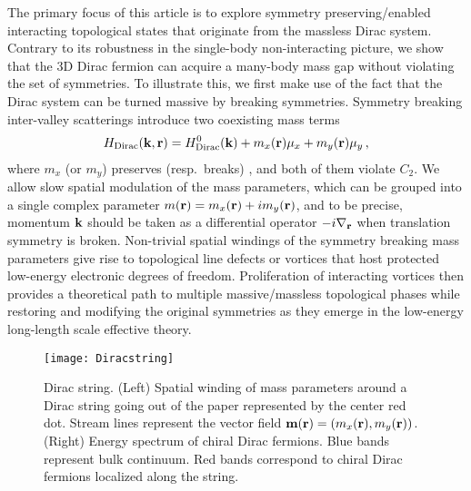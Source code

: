 The primary focus of this article is to explore symmetry preserving/enabled interacting topological states that originate from the massless Dirac system. Contrary to its robustness in the single-body non-interacting picture, we show that the 3D Dirac fermion can acquire a many-body mass gap without violating the set of symmetries. To illustrate this, we first make use of the fact that the Dirac system can be turned massive by breaking symmetries. Symmetry breaking inter-valley scatterings introduce two coexisting mass terms \begin{align}H_{\mathrm{Dirac}}({\bf k},{\bf r})=H_{\mathrm{Dirac}}^0({\bf k})+m_x({\bf r})\mu_x+m_y({\bf r})\mu_y \,, \label{DiracHam}\end{align} where $m_x$ (or $m_y$) preserves (resp.~breaks) \TR, and both of them violate $C_2$. We allow slow spatial modulation of the mass parameters, which can be grouped into a single complex parameter $m({\bf r})=m_x({\bf r})+im_y({\bf r})$, and to be precise, momentum ${\bf k}$ should be taken as a differential operator $-i\nabla_{\bf r}$ when translation symmetry is broken. Non-trivial spatial windings of the symmetry breaking mass parameters give rise to topological line defects or vortices that host protected low-energy electronic degrees of freedom. Proliferation of interacting vortices then provides a theoretical path to multiple massive/massless topological phases while restoring and modifying the original symmetries as they emerge in the low-energy long-length scale effective theory.

\begin{figure}[htbp]
	\centering\texttt{[image: Diracstring]}
	\caption[Spatial winding of mass parameters around a Dirac string.]{Dirac string. (Left) Spatial winding of mass parameters around a Dirac string going out of the paper represented by the center red dot. Stream lines represent the vector field ${\bf m}({\bf r})=(m_x({\bf r}),m_y({\bf r}))$. (Right) Energy spectrum of chiral Dirac fermions. Blue bands represent bulk continuum. Red bands correspond to chiral Dirac fermions localized along the string.}\label{fig:Diracstring}
\end{figure}

